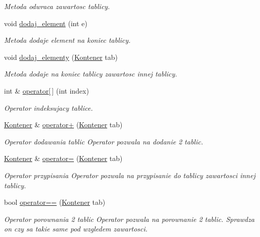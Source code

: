 \begin{DoxyCompactItemize}
\begin{DoxyCompactList}\small\item\em Metoda odwraca zawartosc tablicy. \end{DoxyCompactList}\item 
void \hyperlink{class_kontener_a94d835a8f98052790a812b367f4129e4}{dodaj\-\_\-element} (int e)
\begin{DoxyCompactList}\small\item\em Metoda dodaje element na koniec tablicy. \end{DoxyCompactList}\item 
void \hyperlink{class_kontener_a95a5297fde3434d3c3a2da6aa4ec69d2}{dodaj\-\_\-elementy} (\hyperlink{class_kontener}{Kontener} tab)
\begin{DoxyCompactList}\small\item\em Metoda dodaje na koniec tablicy zawartosc innej tablicy. \end{DoxyCompactList}\item 
int \& \hyperlink{class_kontener_af37b0a656738c7d444161f4dad57b8cf}{operator\mbox{[}$\,$\mbox{]}} (int index)
\begin{DoxyCompactList}\small\item\em Operator indeksujacy tablice. \end{DoxyCompactList}\item 
\hyperlink{class_kontener}{Kontener} \& \hyperlink{class_kontener_abff1153212b0544baed9f7081e16e0de}{operator+} (\hyperlink{class_kontener}{Kontener} tab)
\begin{DoxyCompactList}\small\item\em Operator dodawania tablic Operator pozwala na dodanie 2 tablic. \end{DoxyCompactList}\item 
\hyperlink{class_kontener}{Kontener} \& \hyperlink{class_kontener_a980caf091a2263e759d1c14f5239cafb}{operator=} (\hyperlink{class_kontener}{Kontener} tab)
\begin{DoxyCompactList}\small\item\em Operator przypisania Operator pozwala na przypisanie do tablicy zawartosci innej tablicy. \end{DoxyCompactList}\item 
bool \hyperlink{class_kontener_a4d8165d3e222bdc09e9ab85aed8a3dee}{operator==} (\hyperlink{class_kontener}{Kontener} tab)
\begin{DoxyCompactList}\small\item\em Operator porownania 2 tablic Operator pozwala na porownanie 2 tablic. Sprawdza on czy sa takie same pod wzgledem zawartosci. \end{DoxyCompactList}\end{DoxyCompactItemize}
